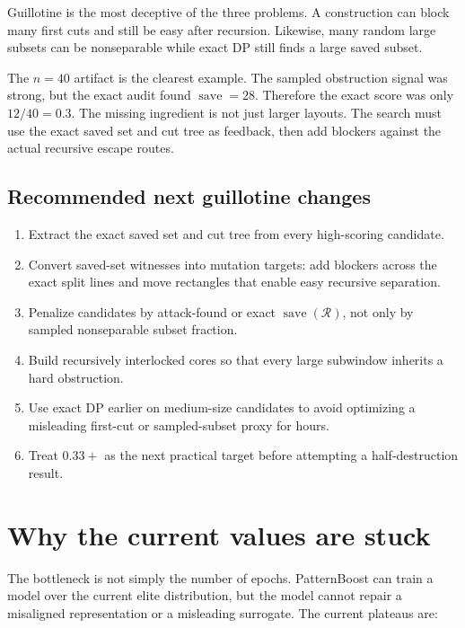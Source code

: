\documentclass[11pt]{article}
\newcommand{\Rcal}{\mathcal{R}}
\newcommand{\save}{\operatorname{save}}
\begin{document}
Guillotine is the most deceptive of the three problems.  A construction can
block many first cuts and still be easy after recursion.  Likewise, many
random large subsets can be nonseparable while exact DP still finds a large
saved subset.

The $n=40$ artifact is the clearest example.  The sampled obstruction signal
was strong, but the exact audit found \(\save=28\).  Therefore the exact score
was only $12/40=0.3$.  The missing ingredient is not just larger layouts.  The
search must use the exact saved set and cut tree as feedback, then add blockers
against the actual recursive escape routes.

\subsection{Recommended next guillotine changes}

\begin{enumerate}
\item Extract the exact saved set and cut tree from every high-scoring
candidate.
\item Convert saved-set witnesses into mutation targets: add blockers across
the exact split lines and move rectangles that enable easy recursive
separation.
\item Penalize candidates by attack-found or exact \(\save(\Rcal)\), not only
by sampled nonseparable subset fraction.
\item Build recursively interlocked cores so that every large subwindow
inherits a hard obstruction.
\item Use exact DP earlier on medium-size candidates to avoid optimizing a
misleading first-cut or sampled-subset proxy for hours.
\item Treat $0.33+$ as the next practical target before attempting a
half-destruction result.
\end{enumerate}

\clearpage
\section{Why the current values are stuck}

The bottleneck is not simply the number of epochs.  PatternBoost can train a
model over the current elite distribution, but the model cannot repair a
misaligned representation or a misleading surrogate.  The current plateaus are:
\end{document}
